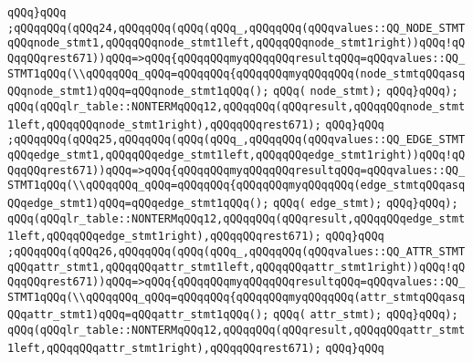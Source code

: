 \verb|qQQq}qQQq|\newline
\verb|;qQQqqQQq(qQQq24,qQQqqQQq(qQQq(qQQq_,qQQqqQQq(qQQqvalues::QQ_NODE_STMTqQQqnode_stmt1,qQQqqQQqnode_stmt1left,qQQqqQQqnode_stmt1right))qQQq!qQQqqQQqrest671))qQQq=>qQQq{qQQqqQQqmyqQQqqQQqresultqQQq=qQQqvalues::QQ_STMT1qQQq(\\qQQqqQQq_qQQq=qQQqqQQq{qQQqqQQqmyqQQqqQQq(node_stmtqQQqasqQQqnode_stmt1)qQQq=qQQqnode_stmt1qQQq();|\newline
\verb|qQQq(|\newline
\verb|node_stmt);|\newline
\verb|qQQq}qQQq);|\newline
\verb|qQQq(qQQqlr_table::NONTERMqQQq12,qQQqqQQq(qQQqresult,qQQqqQQqnode_stmt1left,qQQqqQQqnode_stmt1right),qQQqqQQqrest671);|\newline
\verb|qQQq}qQQq|\newline
\verb|;qQQqqQQq(qQQq25,qQQqqQQq(qQQq(qQQq_,qQQqqQQq(qQQqvalues::QQ_EDGE_STMTqQQqedge_stmt1,qQQqqQQqedge_stmt1left,qQQqqQQqedge_stmt1right))qQQq!qQQqqQQqrest671))qQQq=>qQQq{qQQqqQQqmyqQQqqQQqresultqQQq=qQQqvalues::QQ_STMT1qQQq(\\qQQqqQQq_qQQq=qQQqqQQq{qQQqqQQqmyqQQqqQQq(edge_stmtqQQqasqQQqedge_stmt1)qQQq=qQQqedge_stmt1qQQq();|\newline
\verb|qQQq(|\newline
\verb|edge_stmt);|\newline
\verb|qQQq}qQQq);|\newline
\verb|qQQq(qQQqlr_table::NONTERMqQQq12,qQQqqQQq(qQQqresult,qQQqqQQqedge_stmt1left,qQQqqQQqedge_stmt1right),qQQqqQQqrest671);|\newline
\verb|qQQq}qQQq|\newline
\verb|;qQQqqQQq(qQQq26,qQQqqQQq(qQQq(qQQq_,qQQqqQQq(qQQqvalues::QQ_ATTR_STMTqQQqattr_stmt1,qQQqqQQqattr_stmt1left,qQQqqQQqattr_stmt1right))qQQq!qQQqqQQqrest671))qQQq=>qQQq{qQQqqQQqmyqQQqqQQqresultqQQq=qQQqvalues::QQ_STMT1qQQq(\\qQQqqQQq_qQQq=qQQqqQQq{qQQqqQQqmyqQQqqQQq(attr_stmtqQQqasqQQqattr_stmt1)qQQq=qQQqattr_stmt1qQQq();|\newline
\verb|qQQq(|\newline
\verb|attr_stmt);|\newline
\verb|qQQq}qQQq);|\newline
\verb|qQQq(qQQqlr_table::NONTERMqQQq12,qQQqqQQq(qQQqresult,qQQqqQQqattr_stmt1left,qQQqqQQqattr_stmt1right),qQQqqQQqrest671);|\newline
\verb|qQQq}qQQq|\newline
